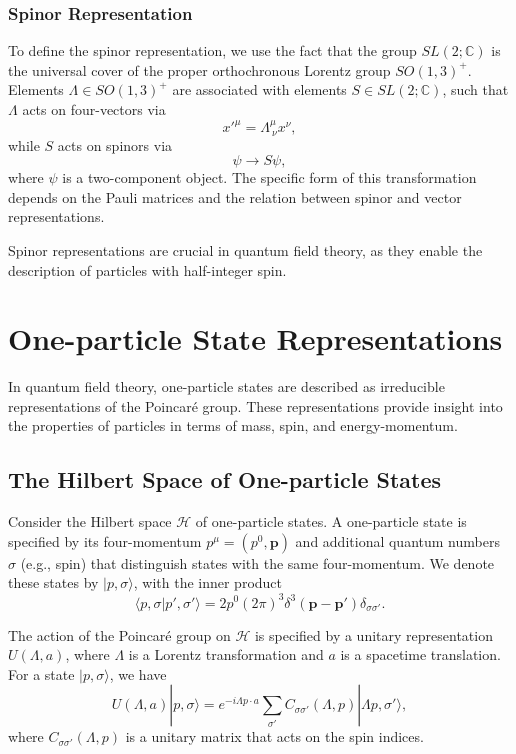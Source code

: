 \subsubsection{Spinor Representation}

To define the spinor representation, we use the fact that the group $SL(2; \mathbb{C})$ is the universal cover of the proper orthochronous Lorentz group $SO(1,3)^+$. Elements $\Lambda \in SO(1,3)^+$ are associated with elements $S \in SL(2; \mathbb{C})$, such that $\Lambda$ acts on four-vectors via
\[
x'^\mu = \Lambda^\mu_{\ \nu} x^\nu,
\]
while $S$ acts on spinors via
\[
\psi \to S \psi,
\]
where $\psi$ is a two-component object. The specific form of this transformation depends on the Pauli matrices and the relation between spinor and vector representations.

Spinor representations are crucial in quantum field theory, as they enable the description of particles with half-integer spin.

\section{One-particle State Representations}

In quantum field theory, one-particle states are described as irreducible representations of the Poincaré group. These representations provide insight into the properties of particles in terms of mass, spin, and energy-momentum.

\subsection{The Hilbert Space of One-particle States}

Consider the Hilbert space $\mathcal{H}$ of one-particle states. A one-particle state is specified by its four-momentum $p^\mu = (p^0, \mathbf{p})$ and additional quantum numbers $\sigma$ (e.g., spin) that distinguish states with the same four-momentum. We denote these states by $|p, \sigma \rangle$, with the inner product
\[
\langle p, \sigma | p', \sigma' \rangle = 2 p^0 (2\pi)^3 \delta^3(\mathbf{p} - \mathbf{p}') \delta_{\sigma \sigma'}.
\]

The action of the Poincaré group on $\mathcal{H}$ is specified by a unitary representation $U(\Lambda, a)$, where $\Lambda$ is a Lorentz transformation and $a$ is a spacetime translation. For a state $|p, \sigma \rangle$, we have
\[
U(\Lambda, a) |p, \sigma \rangle = e^{-i \Lambda p \cdot a} \sum_{\sigma'} C_{\sigma \sigma'}(\Lambda, p) | \Lambda p, \sigma' \rangle,
\]
where $C_{\sigma \sigma'}(\Lambda, p)$ is a unitary matrix that acts on the spin indices.

